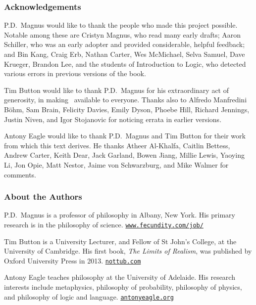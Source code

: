 \thispagestyle{empty}
\onecolumn



\subsubsection*{Acknowledgements}
P.D.\ Magnus would like to thank the people who made this project possible. Notable among these are Cristyn Magnus, who read many early drafts; Aaron Schiller, who was an early adopter and provided considerable, helpful feedback; {and} Bin Kang, Craig Erb, Nathan Carter, Wes McMichael, Selva Samuel,  Dave Krueger, Brandon Lee, and the students of Introduction to Logic, who detected various errors in previous versions of the book. \medskip

Tim Button would like to thank P.D.\ Magnus for his extraordinary act of generosity, in making \forallx\ available to everyone. Thanks also to Alfredo Manfredini Böhm, Sam Brain, Felicity Davies, Emily Dyson, Phoebe Hill, Richard Jennings, Justin Niven,  and Igor Stojanovic for noticing errata in earlier versions. \medskip

Antony Eagle would like to thank P.D.\ Magnus and Tim Button for their work from which this text derives. He thanks Atheer Al-Khalfa, Caitlin Bettess, Andrew Carter, Keith Dear, Jack Garland, Bowen Jiang, Millie Lewis, Yaoying Li, Jon Opie, Matt Nestor, Jaime von Schwarzburg, and Mike Walmer for comments.  %

\subsubsection*{About the Authors}


P.D.\ Magnus is a professor of philosophy in Albany, New York. His primary research is in the philosophy of science. \href{https://www.fecundity.com/job/}{\nolinkurl{www.fecundity.com/job/}}
\medskip

Tim Button is a University Lecturer, and Fellow of St John's College, at the University of Cambridge. His first book, \emph{The Limits of Realism}, was published by Oxford University Press in 2013. \href{http://nottub.com}{\nolinkurl{nottub.com}}
\medskip

Antony Eagle teaches philosophy at the University of Adelaide. His research interests include metaphysics, philosophy of probability, philosophy of physics, and philosophy of logic and language. \href{https://antonyeagle.org}{\nolinkurl{antonyeagle.org}}



